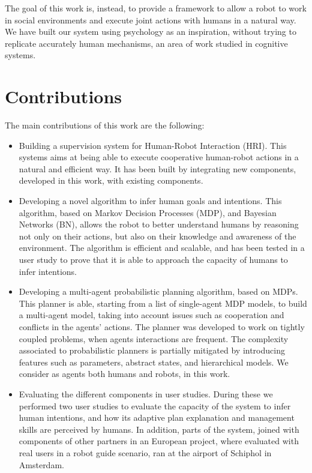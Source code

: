 The goal of this work is, instead, to provide a framework to allow a robot to work in social environments and execute joint actions with humans in a natural way. We have built our system using psychology as an inspiration, without trying to replicate accurately human mechanisms, an area of work studied in cognitive systems. 

\section{Contributions}

The main contributions of this work are the following:
\begin{itemize}
\item Building a supervision system for Human-Robot Interaction (HRI). This systems aims at being able to execute cooperative human-robot actions in a natural and efficient way. It has been built by integrating new components, developed in this work, with existing components.
\item Developing a novel algorithm to infer human goals and intentions. This algorithm, based on Markov Decision Processes (MDP), and Bayesian Networks (BN), allows the robot to better understand humans by reasoning not only on their actions, but also on their knowledge and awareness of the environment. The algorithm is efficient and scalable, and has been tested in a user study to prove that it is able to approach the capacity of humans to infer intentions.
\item Developing a multi-agent probabilistic planning algorithm, based on MDPs. This planner is able, starting from a list of single-agent MDP models, to build a multi-agent model, taking into account issues such as cooperation and conflicts in the agents' actions. The planner was developed to work on tightly coupled problems, when agents interactions are frequent. The complexity associated to probabilistic planners is partially mitigated by introducing features such as parameters, abstract states, and hierarchical models. We consider as agents both humans and robots, in this work.
\item Evaluating the different components in user studies. During these we performed two user studies to evaluate the capacity of the system to infer human intentions, and how its adaptive plan explanation and management skills are perceived by humans. In addition, parts of the system, joined with components of other partners in an European project, where evaluated with real users in a robot guide scenario, ran at the airport of Schiphol in Amsterdam.
\end{itemize}

